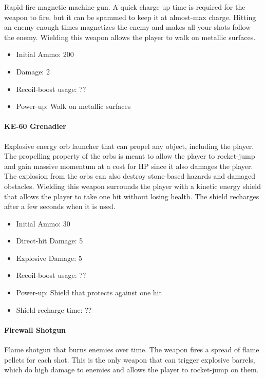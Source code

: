 \documentclass[12pt]{article}
\begin{document}
Rapid-fire magnetic machine-gun. A quick charge up time is required for the weapon to fire, but it can be spammed to keep it at almost-max charge. Hitting an enemy enough times magnetizes the enemy and makes all your shots follow the enemy. Wielding this weapon allows the player to walk on metallic surfaces.

\begin{itemize}
	\item Initial Ammo: 200
	\item Damage: 2
	\item Recoil-boost usage: ??
	\item Power-up: Walk on metallic surfaces
\end{itemize}


\paragraph{KE-60 Grenadier}

Explosive energy orb launcher that can propel any object, including the player. The propelling property of the orbs is meant to allow the player to rocket-jump and gain massive momentum at a cost for HP since it also damages the player. The explosion from the orbs can also destroy stone-based hazards and damaged obstacles. Wielding this weapon surrounds the player with a kinetic energy shield that allows the player to take one hit without losing health. The shield recharges after a few seconds when it is used.

\begin{itemize}
	\item Initial Ammo: 30
	\item Direct-hit Damage: 5
	\item Explosive Damage: 5
	\item Recoil-boost usage: ??
	\item Power-up: Shield that protects against one hit
	\item Shield-recharge time: ??
\end{itemize} 


\paragraph{Firewall Shotgun}

Flame shotgun that burns enemies over time. The weapon fires a spread of flame pellets for each shot. This is the only weapon that can trigger explosive barrels, which do high damage to enemies and allows the player to rocket-jump on them. 
\end{document}
